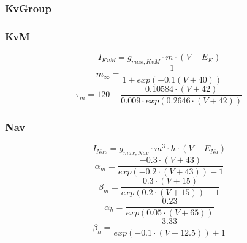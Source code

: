 \documentclass[12pt]{article}
\begin{document}
\subsubsection{KvGroup}


\subsubsection{KvM}
\begin{equation}
I_{KvM} = g_{max, KvM} \cdot m \cdot (V - E_K)
\end{equation}
\begin{equation}
m_{\infty} = \frac{1}{1 + exp(-0.1(V + 40)) }
\end{equation}
\begin{equation}
\tau_{m} = 120 + \frac{0.10584 \cdot (V + 42)}{0.009 \cdot exp(0.2646 \cdot (V + 42)) }
\end{equation}

\subsubsection{Nav}
\begin{equation}
I_{Nav} = g_{max, Nav} \cdot m^3 \cdot h \cdot (V - E_{Na})
\end{equation}
\begin{equation}
\alpha_m = \frac{-0.3 \cdot (V + 43)}{exp(-0.2\cdot(V+43)) - 1}
\end{equation}
\begin{equation}
\beta_m = \frac{0.3 \cdot (V + 15)}{exp(0.2\cdot(V+15)) - 1}
\end{equation}
\begin{equation}
\alpha_h = \frac{0.23}{exp(0.05\cdot(V+65))}
\end{equation}
\begin{equation}
\beta_h = \frac{3.33}{exp(-0.1\cdot(V+12.5)) + 1}
\end{equation}
\end{document}
